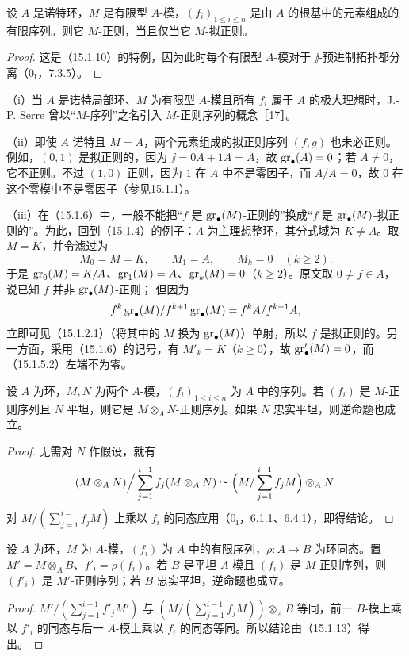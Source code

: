 设 $A$ 是诺特环，$M$ 是有限型 $A$-模，$(f_i)_{1\leq i\leq n}$ 是由 $A$ 的根基中的元素组成的有限序列。则它 $M$-正则，当且仅当它 $M$-拟正则。
\begin{proof}
这是（15.1.10）的特例，因为此时每个有限型 $A$-模对于 $\jj$-预进制拓扑都分离（$0_{\mathrm I}$，7.3.5）。
\end{proof}

（i）当 $A$ 是诺特局部环、$M$ 为有限型 $A$-模且所有 $f_i$ 属于 $A$ 的极大理想时，J.-P. Serre 曾以“$M$-序列”之名引入 $M$-正则序列的概念［17］。

（ii）即使 $A$ 诺特且 $M=A$，两个元素组成的拟正则序列 $(f,g)$ 也未必正则。例如，$(0,1)$ 是拟正则的，因为 $\jj=0A+1A=A$，故 $\operatorname{gr}_\bullet(A)=0$；若 $A\ne0$，它不正则。不过 $(1,0)$ 正则，因为 $1$ 在 $A$ 中不是零因子，而 $A/A=0$，故 $0$ 在这个零模中不是零因子（参见15.1.1）。

（iii）在（15.1.6）中，一般不能把“$f$ 是 $\operatorname{gr}_\bullet(M)$-正则的”换成“$f$ 是 $\operatorname{gr}_\bullet(M)$-拟正则的”。为此，回到（15.1.4）的例子：$A$ 为主理想整环，其分式域为 $K\ne A$。取 $M=K$，并令滤过为
\[
 M_0=M=K,\qquad M_1=A,\qquad M_k=0\quad(k\geq2).
\]
于是 $\operatorname{gr}_0(M)=K/A$、$\operatorname{gr}_1(M)=A$、$\operatorname{gr}_k(M)=0$（$k\geq2$）。原文取 $0\ne f\in A$，说已知 $f$ 并非 $\operatorname{gr}_\bullet(M)$-正则；
但因为
\[
 f^k\operatorname{gr}_\bullet(M)/f^{k+1}\operatorname{gr}_\bullet(M)=f^kA/f^{k+1}A,
\]
立即可见（15.1.2.1）（将其中的 $M$ 换为 $\operatorname{gr}_\bullet(M)$）单射，所以 $f$ 是拟正则的。另一方面，采用（15.1.6）的记号，有 $M'_k=K$（$k\geq0$），故 $\operatorname{gr}'_\bullet(M)=0$，而（15.1.5.2）左端不为零。

设 $A$ 为环，$M,N$ 为两个 $A$-模，$(f_i)_{1\leq i\leq n}$ 为 $A$ 中的序列。若 $(f_i)$ 是 $M$-正则序列且 $N$ 平坦，则它是 $M\otimes_A N$-正则序列。如果 $N$ 忠实平坦，则逆命题也成立。
\begin{proof}
无需对 $N$ 作假设，就有
\[
 (M\otimes_A N)\Big/\sum_{j=1}^{i-1}f_j(M\otimes_A N)
 \simeq\Bigl(M/\sum_{j=1}^{i-1}f_jM\Bigr)\otimes_A N.
\]
对 $M/(\sum_{j=1}^{i-1}f_jM)$ 上乘以 $f_i$ 的同态应用（$0_{\mathrm I}$，6.1.1、6.4.1），即得结论。
\end{proof}

设 $A$ 为环，$M$ 为 $A$-模，$(f_i)$ 为 $A$ 中的有限序列，$\rho:A\to B$ 为环同态。置
$M'=M\otimes_A B$、$f'_i=\rho(f_i)$。若 $B$ 是平坦 $A$-模且 $(f_i)$ 是 $M$-正则序列，则 $(f'_i)$ 是 $M'$-正则序列；若 $B$ 忠实平坦，逆命题也成立。
\begin{proof}
$M'/(\sum_{j=1}^{i-1}f'_jM')$ 与 $(M/(\sum_{j=1}^{i-1}f_jM))\otimes_A B$ 等同，前一 $B$-模上乘以 $f'_i$ 的同态与后一 $A$-模上乘以 $f_i$ 的同态等同。所以结论由（15.1.13）得出。
\end{proof}

